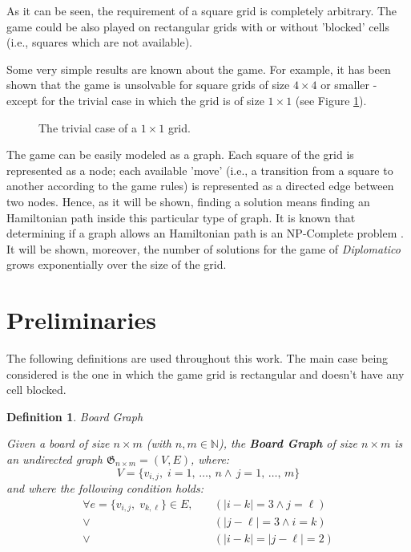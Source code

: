 \documentclass[conference]{IEEEtran}
\newtheorem{definition}{Definition}[section]
\begin{document}
As it can be seen, the requirement of a square grid is completely arbitrary. The game could be also played on rectangular grids with or without 'blocked' cells (i.e., squares which are not available).

Some very simple results are known about the game. 
For example, it has been shown that the game is unsolvable for square grids of size $4 \times 4$ or smaller - except for the trivial case in which the grid is of size $1 \times 1$ (see Figure \ref{fig:trivial_case}).

\begin{figure}[ht]
\centering
{}
\caption{The trivial case of a $1 \times 1$ grid.}
\label{fig:trivial_case}
\end{figure}

The game can be easily modeled as a graph. Each square of the grid is represented as a node; each available 'move' (i.e., a transition from a square to another according to the game rules) is represented as a directed edge between two nodes. Hence, as it will be shown, finding a solution means finding an Hamiltonian path inside this particular type of graph. It is known that determining if a graph allows an Hamiltonian path is an NP-Complete problem \cite{np}. It will be shown, moreover, the number of solutions for the game of \textit{Diplomatico} grows exponentially over the size of the grid.

\section{Preliminaries}
The following definitions are used throughout this work. The main case being considered is the one in which the game grid is rectangular and doesn't have any cell blocked.

\begin{definition}{Board Graph}{}
\label{def:board_graph}

Given a board of size $n \times m$ (with $n, m \in \mathbb{N}$), the \textbf{Board Graph} of size $n \times m$ is an undirected graph $\mathfrak{G}_{n \times m} = (V, E)$, where:
$$
    V = \{v_{i,j},\;i = 1,\,\dots,\,n \land \, j = 1,\,\dots,\,m\}
$$
and where the following condition holds:
\begin{align*}
\forall e = \{v_{i,j},\;v_{k,\ell}\} \in E,\quad&(|i - k| = 3 \land j = \ell) \\
\lor\,& (|j - \ell| = 3 \land i = k) \\
\lor\,& (|i - k| = |j - \ell| = 2)
\end{align*}

\end{definition}
\end{document}
